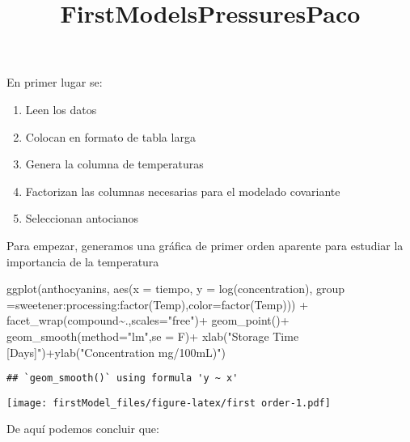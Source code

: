 \documentclass[
]{article}
\title{FirstModelsPressuresPaco}
\author{}
\date{\vspace{-2.5em}}
\newenvironment{Shaded}{\begin{snugshade}}{\end{snugshade}}
\newcommand{\AttributeTok}[1]{\textcolor[rgb]{0.77,0.63,0.00}{#1}}
\newcommand{\FunctionTok}[1]{\textcolor[rgb]{0.00,0.00,0.00}{#1}}
\newcommand{\NormalTok}[1]{#1}
\newcommand{\SpecialCharTok}[1]{\textcolor[rgb]{0.00,0.00,0.00}{#1}}
\newcommand{\StringTok}[1]{\textcolor[rgb]{0.31,0.60,0.02}{#1}}
\providecommand{\tightlist}{%
  \setlength{\itemsep}{0pt}\setlength{\parskip}{0pt}}
\begin{document}
\maketitle

En primer lugar se:

\begin{enumerate}
\def\labelenumi{\arabic{enumi}.}
\tightlist
\item
  Leen los datos
\item
  Colocan en formato de tabla larga
\item
  Genera la columna de temperaturas
\item
  Factorizan las columnas necesarias para el modelado covariante
\item
  Seleccionan antocianos
\end{enumerate}

Para empezar, generamos una gráfica de primer orden aparente para
estudiar la importancia de la temperatura

\begin{Shaded}
\begin{Highlighting}[]
\FunctionTok{ggplot}\NormalTok{(anthocyanins, }
       \FunctionTok{aes}\NormalTok{(}\AttributeTok{x =}\NormalTok{ tiempo, }\AttributeTok{y =} \FunctionTok{log}\NormalTok{(concentration), }\AttributeTok{group =}\NormalTok{sweetener}\SpecialCharTok{:}\NormalTok{processing}\SpecialCharTok{:}\FunctionTok{factor}\NormalTok{(Temp),}\AttributeTok{color=}\FunctionTok{factor}\NormalTok{(Temp))) }\SpecialCharTok{+}
  \FunctionTok{facet\_wrap}\NormalTok{(compound}\SpecialCharTok{\textasciitilde{}}\NormalTok{.,}\AttributeTok{scales=}\StringTok{"free"}\NormalTok{)}\SpecialCharTok{+}
  \FunctionTok{geom\_point}\NormalTok{()}\SpecialCharTok{+} \FunctionTok{geom\_smooth}\NormalTok{(}\AttributeTok{method=}\StringTok{"lm"}\NormalTok{,}\AttributeTok{se =}\NormalTok{ F)}\SpecialCharTok{+}
  \FunctionTok{xlab}\NormalTok{(}\StringTok{"Storage Time [Days]"}\NormalTok{)}\SpecialCharTok{+}\FunctionTok{ylab}\NormalTok{(}\StringTok{"Concentration mg/100mL)"}\NormalTok{)}
\end{Highlighting}
\end{Shaded}

\begin{verbatim}
## `geom_smooth()` using formula 'y ~ x'
\end{verbatim}

\texttt{[image: firstModel\_files/figure-latex/first order-1.pdf]}

De aquí podemos concluir que:
\end{document}
